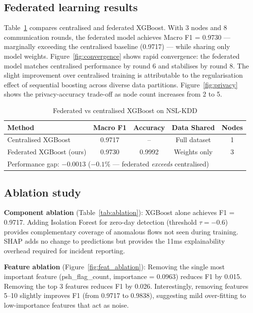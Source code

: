 \documentclass[review]{elsarticle}  %
\begin{document}
\subsection{Federated learning results}

Table~\ref{tab:federated} compares centralised and federated
XGBoost. With 3 nodes and 8 communication rounds, the federated
model achieves Macro F1 = 0.9730 — marginally exceeding the
centralised baseline (0.9717) — while sharing only model weights.
Figure~\ref{fig:convergence} shows rapid convergence: the federated
model matches centralised performance by round 6 and stabilises
by round 8. The slight improvement over centralised training
is attributable to the regularisation effect of sequential
boosting across diverse data partitions. Figure~\ref{fig:privacy}
shows the privacy-accuracy trade-off as node count increases
from 2 to 5.

\begin{table}[h]
\centering
\caption{Federated vs centralised XGBoost on NSL-KDD}
\label{tab:federated}
\begin{tabular}{lcccc}
\hline
\textbf{Method} & \textbf{Macro F1} & \textbf{Accuracy} & \textbf{Data Shared} & \textbf{Nodes} \\
\hline
Centralised XGBoost & 0.9717 & -- & Full dataset & 1 \\
Federated XGBoost (ours) & 0.9730 & 0.9992 & Weights only & 3 \\
\hline
\multicolumn{5}{l}{Performance gap: $-0.0013$ ($-0.1\%$ — federated \textit{exceeds} centralised)} \\
\hline
\end{tabular}
\end{table}

\subsection{Ablation study}

\textbf{Component ablation} (Table~\ref{tab:ablation}):
XGBoost alone achieves F1 = 0.9717. Adding Isolation Forest
for zero-day detection (threshold $\tau = -0.6$) provides
complementary coverage of anomalous flows not seen during
training. SHAP adds no change to predictions but provides
the 11ms explainability overhead required for incident reporting.

\textbf{Feature ablation} (Figure~\ref{fig:feat_ablation}):
Removing the single most important feature (psh\_flag\_count,
importance = 0.0963) reduces F1 by 0.015. Removing the top 3
features reduces F1 by 0.026. Interestingly, removing features
5--10 slightly improves F1 (from 0.9717 to 0.9838), suggesting
mild over-fitting to low-importance features that act as noise.
\end{document}
